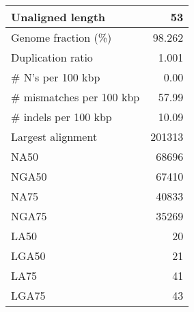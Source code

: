 \documentclass[12pt,a4paper]{article}
\begin{document}
\begin{table}[ht]
\begin{center}
\begin{tabular}{|l*{1}{|r}|}
Unaligned length & 53 \\ \hline
Genome fraction (\%) & 98.262 \\ \hline
Duplication ratio & 1.001 \\ \hline
\# N's per 100 kbp & 0.00 \\ \hline
\# mismatches per 100 kbp & 57.99 \\ \hline
\# indels per 100 kbp & 10.09 \\ \hline
Largest alignment & 201313 \\ \hline
NA50 & 68696 \\ \hline
NGA50 & 67410 \\ \hline
NA75 & 40833 \\ \hline
NGA75 & 35269 \\ \hline
LA50 & 20 \\ \hline
LGA50 & 21 \\ \hline
LA75 & 41 \\ \hline
LGA75 & 43 \\ \hline
\end{tabular}
\end{center}
\end{table}
\end{document}
